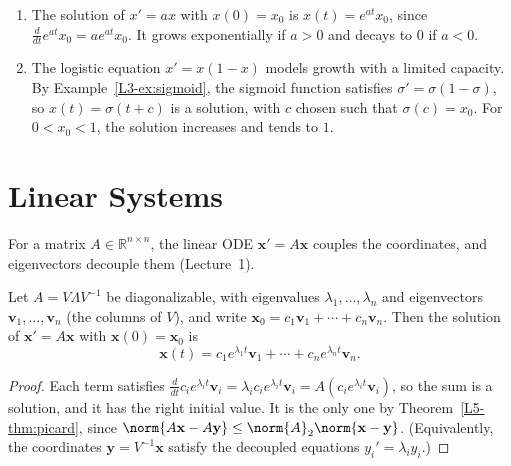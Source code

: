 \begin{example}\label{L5-ex:scalar-ode}
    \begin{enumerate}
        \item The solution of $x' = ax$ with $x(0) = x_0$ is $x(t) = e^{at}x_0$, since $\frac{d}{dt}e^{at}x_0 = ae^{at}x_0$. It grows exponentially if $a > 0$ and decays to $0$ if $a < 0$.
        \item The logistic equation $x' = x(1 - x)$ models growth with a limited capacity. By Example~\ref{L3-ex:sigmoid}, the sigmoid function satisfies $\sigma' = \sigma(1 - \sigma)$, so $x(t) = \sigma(t + c)$ is a solution, with $c$ chosen such that $\sigma(c) = x_0$. For $0 < x_0 < 1$, the solution increases and tends to $1$.
    \end{enumerate}
\end{example}

\section{Linear Systems}\label{L5-sec:linear-ode}


For a matrix $A \in \mathbb{R}^{n \times n}$, the linear ODE $\mathbf{x}' = A\mathbf{x}$ couples the coordinates, and eigenvectors decouple them (Lecture~1).

\begin{proposition}\label{L5-prop:linear-ode}
    Let $A = V\Lambda V^{-1}$ be diagonalizable, with eigenvalues $\lambda_1, \ldots, \lambda_n$ and eigenvectors $\mathbf{v}_1, \ldots, \mathbf{v}_n$ (the columns of $V$), and write $\mathbf{x}_0 = c_1\mathbf{v}_1 + \cdots + c_n\mathbf{v}_n$. Then the solution of $\mathbf{x}' = A\mathbf{x}$ with $\mathbf{x}(0) = \mathbf{x}_0$ is
    \[\mathbf{x}(t) = c_1e^{\lambda_1 t}\mathbf{v}_1 + \cdots + c_ne^{\lambda_n t}\mathbf{v}_n.\]
\end{proposition}

\begin{proof}
    Each term satisfies $\frac{d}{dt}c_ie^{\lambda_i t}\mathbf{v}_i = \lambda_ic_ie^{\lambda_i t}\mathbf{v}_i = A(c_ie^{\lambda_i t}\mathbf{v}_i)$, so the sum is a solution, and it has the right initial value. It is the only one by Theorem~\ref{L5-thm:picard}, since $\norm{A\mathbf{x} - A\mathbf{y}} \leq \norm{A}_2\norm{\mathbf{x} - \mathbf{y}}$. (Equivalently, the coordinates $\mathbf{y} = V^{-1}\mathbf{x}$ satisfy the decoupled equations $y_i' = \lambda_i y_i$.)
\end{proof}

